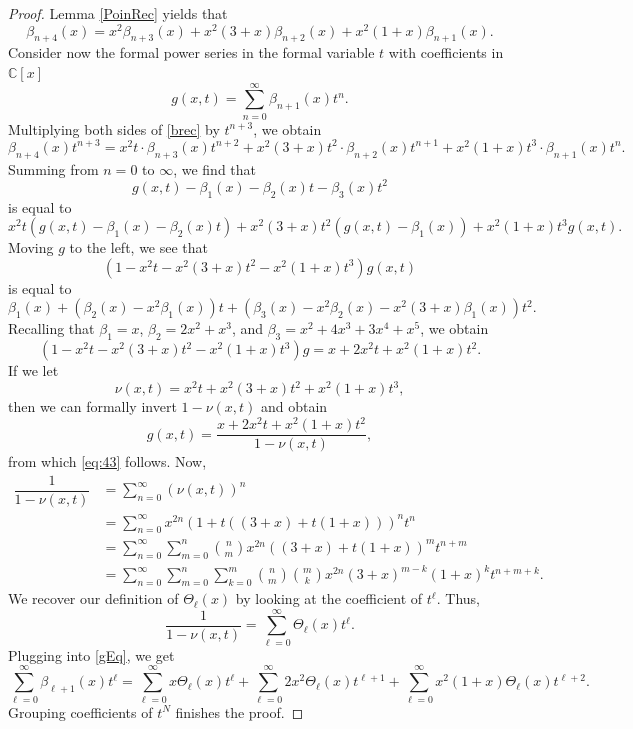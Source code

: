 \documentclass[12pt]{amsart}
\theoremstyle{definition}
\begin{document}
\begin{proof}
    Lemma \ref{PoinRec} yields that \begin{equation}\label{brec} \beta_{n+4}(x) = x^2 \beta_{n+3}(x) + x^2(3+x)\beta_{n+2}(x)+x^2(1+x)\beta_{n+1}(x).
    \end{equation}  
    Consider now the formal power series in the formal variable $t$ with coefficients in $\mathbb{C}[x]$
    \[
    g(x,t)= \sum_{n=0}^\infty \beta_{n+1}(x) t^n .
    \]
    Multiplying both sides of \eqref{brec} by $t^{n+3}$, we obtain 
    \[   
    \beta_{n+4}(x) t^{n+3} = x^2 t \cdot \beta_{n+3}(x)t^{n+2} + x^2(3+x) t^2\cdot \beta_{n+2}(x)t^{n+1} + x^2(1+x)t^3 \cdot \beta_{n+1}(x) t^n.
    \]
    Summing from $n=0$ to $\infty$, we find that 
    \[ g(x,t) - \beta_1(x) - \beta_2(x) t - \beta_3(x) t^2
    \]
    is equal to
    \[
    x^2t (g(x,t)-\beta_1(x) - \beta_2(x) t) + x^2(3+x) t^2 (g(x,t)-\beta_1(x)) + x^2(1+x)t^3g(x,t).
    \] 
    Moving $g$ to the left, we see that \[(1-x^2t - x^2(3+x)t^2 - x^2(1+x)t^3)g(x,t)\]
    is equal to
    \[
\beta_1(x) + (\beta_2(x) -x^2 \beta_1(x)) t + (\beta_3(x) - x^2 \beta_2(x) - x^2(3+x)\beta_1(x))t^2.
    \]
    Recalling that $\beta_1 = x$, $\beta_2 = 2x^2+x^3$, and $\beta_3 = x^2 + 4x^3 + 3x^4+x^5$, we obtain 
    \[ 
    (1-x^2 t- x^2(3+x) t^2 - x^2(1+x)t^3)g = x + 2x^2 t + x^2(1+x)t^2.
    \]
    If we let 
    \[\nu(x,t) = x^2 t + x^2 (3+x)t^2 + x^2(1+x)t^3,
    \]
    then we can formally invert $1-\nu(x,t)$ and obtain 
    \begin{equation}\label{gEq} g(x,t)  =  \dfrac{x+2x^2 t + x^2(1+x)t^2}{1- \nu(x,t)},\end{equation} 
    from which \eqref{eq:43} follows. Now, 
    \begin{align*}
    \dfrac{1}{1-\nu(x,t)} &= \sum_{n=0 }^\infty (\nu(x,t))^n \\
    &= \sum_{n=0}^\infty x^{2n} (1+ t((3+x) + t(1+x)) )^n  t^n\\
    &= \sum_{n=0}^\infty \sum_{m=0}^n \binom{n}{m} x^{2n}  ((3+x) + t (1+x))^m t^{n+m}\\
    &= \sum_{n=0}^\infty \sum_{m=0}^n \sum_{k=0}^m \binom{n}{m} \binom{m}{k} x^{2n} (3+x)^{m-k} (1+x)^k t^{n+m+k}.
    \end{align*}
    We recover our definition of $\Theta_\ell(x)$ by looking at the coefficient of $t^\ell$. Thus, 
    \[
    \dfrac{1}{1-\nu(x,t)} = \sum_{\ell=0}^\infty \Theta_\ell(x) t^\ell.
    \] 
    Plugging into \eqref{gEq}, we get 
    \[ 
    \sum_{\ell=0}^\infty  \beta_{\ell+1}(x) t^\ell =  \sum_{\ell=0}^\infty x \Theta_\ell(x) t^\ell + \sum_{\ell=0}^\infty 2x^2 \Theta_\ell(x) t^{\ell+1} + \sum_{\ell=0}^\infty x^2(1+x)\Theta_\ell(x) t^{\ell+2}.
    \] 
    Grouping coefficients of $t^N$ finishes the proof.
\end{proof}
\end{document}
